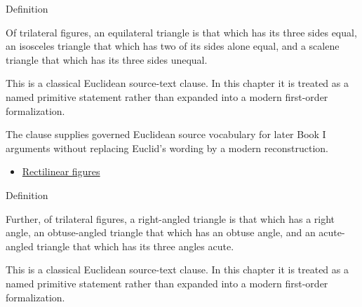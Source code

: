 \begin{definitionbox}{Definition}
\begin{definition}
\label{def:euclid-triangle-side-classes}
Of trilateral figures, an equilateral triangle is that which has its three
sides equal, an isosceles triangle that which has two of its sides alone equal,
and a scalene triangle that which has its three sides unequal.
\end{definition}
\end{definitionbox}
\begin{remark*}
This is a classical Euclidean source-text clause. In this chapter it is treated
as a named primitive statement rather than expanded into a modern first-order
formalization.
\end{remark*}

\begin{remark*}[Interpretation]
The clause supplies governed Euclidean source vocabulary for later Book I
arguments without replacing Euclid's wording by a modern reconstruction.
\end{remark*}

\begin{lra-not-visible}
\begin{dependencies}
\begin{itemize}
  \item \hyperref[def:euclid-rectilinear-figures]{Rectilinear figures}
\end{itemize}
\end{dependencies}
\end{lra-not-visible}

\begin{definitionbox}{Definition}
\begin{definition}
\label{def:euclid-triangle-angle-classes}
Further, of trilateral figures, a right-angled triangle is that which has a
right angle, an obtuse-angled triangle that which has an obtuse angle, and an
acute-angled triangle that which has its three angles acute.
\end{definition}
\end{definitionbox}
\begin{remark*}
This is a classical Euclidean source-text clause. In this chapter it is treated
as a named primitive statement rather than expanded into a modern first-order
formalization.
\end{remark*}

